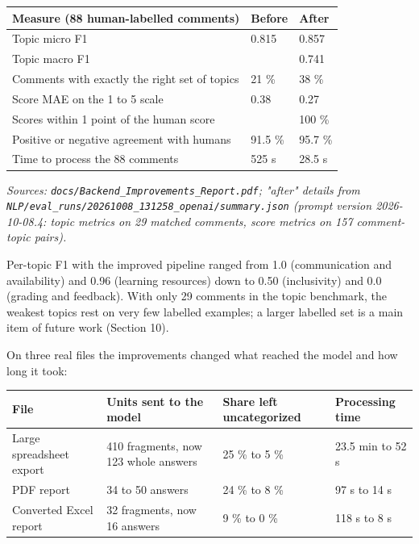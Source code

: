 \documentclass[
  11pt,
]{article}
\newcounter{none} %
\begin{document}
{\def\LTcaptype{none} %
\begin{longtable}[]{@{}lll@{}}
\toprule\noalign{}
Measure (88 human-labelled comments) & Before & After \\
\midrule\noalign{}
\endhead
\bottomrule\noalign{}
\endlastfoot
Topic micro F1 & 0.815 & 0.857 \\
Topic macro F1 & & 0.741 \\
Comments with exactly the right set of topics & 21 \% & 38 \% \\
Score MAE on the 1 to 5 scale & 0.38 & 0.27 \\
Scores within 1 point of the human score & & 100 \% \\
Positive or negative agreement with humans & 91.5 \% & 95.7 \% \\
Time to process the 88 comments & 525 s & 28.5 s \\
\end{longtable}
}

\emph{Sources: \texttt{docs/Backend\_Improvements\_Report.pdf}; "after" details
from \texttt{NLP/eval\_runs/20261008\_131258\_openai/summary.json} (prompt
version 2026-10-08.4: topic metrics on 29 matched comments, score metrics on 157
comment-topic pairs).}

Per-topic F1 with the improved pipeline ranged from 1.0 (communication and
availability) and 0.96 (learning resources) down to 0.50 (inclusivity) and 0.0
(grading and feedback). With only 29 comments in the topic benchmark, the
weakest topics rest on very few labelled examples; a larger labelled set is a
main item of future work (Section 10).

On three real files the improvements changed what reached the model and how long
it took:

{\def\LTcaptype{none} %
\begin{longtable}[]{@{}llll@{}}
\toprule\noalign{}
File & Units sent to the model & Share left uncategorized & Processing time \\
\midrule\noalign{}
\endhead
\bottomrule\noalign{}
\endlastfoot
Large spreadsheet export & 410 fragments, now 123 whole answers & 25 \% to 5 \%
& 23.5 min to 52 s \\
PDF report & 34 to 50 answers & 24 \% to 8 \% & 97 s to 14 s \\
Converted Excel report & 32 fragments, now 16 answers & 9 \% to 0 \% & 118 s to
8 s \\
\end{longtable}
}
\end{document}
